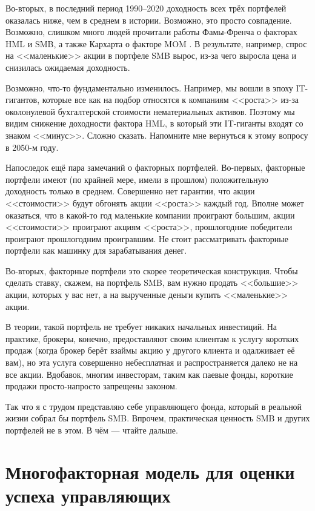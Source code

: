 Во-вторых, в последний период 1990--2020 доходность всех трёх портфелей оказалась ниже, чем в среднем в истории. Возможно, это просто совпадение. Возможно, слишком много людей прочитали работы Фамы-Френча о факторах HML и SMB, а также Кархарта о факторе MOM \cite{carhart1997persistence}. В результате, например, спрос на <<маленькие>> акции в портфеле SMB вырос, из-за чего выросла цена и снизилась ожидаемая доходность.

Возможно, что-то фундаментально изменилось. Например, мы вошли в эпоху IT-гигантов, которые все как на подбор относятся к компаниям <<роста>> из-за околонулевой бухгалтерской стоимости нематериальных активов. Поэтому мы видим снижение доходности фактора HML, в который эти IT-гиганты входят со знаком <<минус>>. Сложно сказать. Напомните мне вернуться к этому вопросу в 2050-м году.

Напоследок ещё пара замечаний о факторных портфелей. Во-первых, факторные портфели имеют (по крайней мере, имели в прошлом) положительную доходность только в среднем. Совершенно нет гарантии, что акции <<стоимости>> будут обгонять акции <<роста>> каждый год. Вполне может оказаться, что в какой-то год маленькие компании проиграют большим, акции <<стоимости>> проиграют акциям <<роста>>, прошлогодние победители проиграют прошлогодним проигравшим. Не стоит рассматривать факторные портфели как машинку для зарабатывания денег.

Во-вторых, факторные портфели это скорее теоретическая конструкция. Чтобы сделать ставку, скажем, на портфель SMB, вам нужно продать  <<большие>> акции, которых у вас нет, а на вырученные деньги купить <<маленькие>> акции.

В теории, такой портфель не требует никаких начальных инвестиций. На практике, брокеры, конечно, предоставляют своим клиентам к услугу коротких продаж (когда брокер берёт взаймы акцию у другого клиента и одалживает её вам), но эта услуга совершенно небесплатная и распространяется далеко не на все акции. Вдобавок, многим инвесторам, таким как паевые фонды, короткие продажи просто-напросто запрещены законом.

Так что я с трудом представляю себе управляющего фонда, который в реальной жизни собрал бы портфель SMB. Впрочем, практическая ценность SMB и других портфелей не в этом. В чём --- чтайте дальше.

\section{Многофакторная модель для оценки успеха управляющих}


